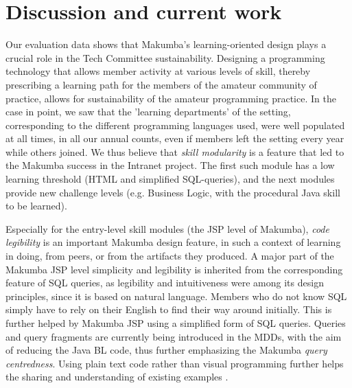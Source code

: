 \documentclass{llncs}
\begin{document}
%

\section{Discussion and current work}\label{sec:disco}
Our evaluation data shows that Makumba's learning-oriented design  plays a crucial role in the Tech Committee sustainability. Designing a programming technology that allows member activity at various levels of skill, thereby prescribing a learning path for the members of the amateur community of practice, allows for sustainability of the amateur programming practice. In the case in point, we saw that the 'learning departments' of the setting, corresponding to the different programming languages used, were well populated at all times, in all our annual counts,  even if members left the setting every year while others joined. We thus believe that \textit{skill modularity} is a feature that led to the Makumba success in the Intranet project. The first such module has a low learning threshold (HTML and simplified SQL-queries), and the next modules provide new challenge levels (e.g. Business Logic, with the procedural Java skill to be learned).

Especially for the entry-level skill modules (the JSP level of Makumba), \textit{code legibility} is an important Makumba design feature, in such a context of learning in doing, from peers, or from the artifacts they produced. 
A major part of the Makumba JSP level simplicity and legibility is inherited from the corresponding feature of SQL queries, as legibility and intuitiveness were among its design principles, since it is based on natural language. Members who do not know SQL simply have to rely on their English to find their way around initially. This is further helped by Makumba JSP using a simplified form of SQL queries. Queries and query fragments are currently being introduced in the MDDs, with the aim of reducing the Java BL code, thus further emphasizing the Makumba \textit{query centredness}. Using plain text code rather than visual programming further helps the sharing and understanding of existing examples \cite{yamauchi00}. 
\end{document}
